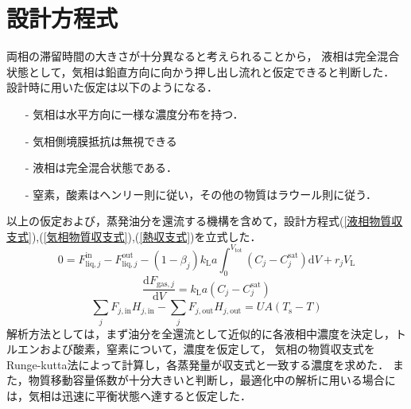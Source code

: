 \documentclass[a4j]{jsreport}
\newcommand{\diff}{\mathrm{d}}
\begin{document}
\section{設計方程式}
両相の滞留時間の大きさが十分異なると考えられることから，
液相は完全混合状態として，気相は鉛直方向に向かう押し出し流れと仮定できると判断した．
設計時に用いた仮定は以下のようになる．
\begin{itemize}
    \item[-] 気相は水平方向に一様な濃度分布を持つ．
    \item[-] 気相側境膜抵抗は無視できる
    \item[-] 液相は完全混合状態である．
    \item[-] 窒素，酸素はヘンリー則に従い，その他の物質はラウール則に従う．
\end{itemize}
以上の仮定および，蒸発油分を還流する機構を含めて，設計方程式(\ref{液相物質収支式}),(\ref{気相物質収支式}),(\ref{熱収支式})を立式した．\\
\begin{equation}
    \label{液相物質収支式}
    0 = F^\text{in}_{\text{liq},j} - F^\text{out}_{\text{liq},j} - (1-\beta_j) k_\mathrm{L}a
    \int^{V_\text{tot}}_0(C_j - C^\text{sat}_j) \diff V + r_j V_\mathrm{L}
\end{equation}
\begin{equation}
    \label{気相物質収支式}
    \frac{ \diff F_{\text{gas},j}}{\diff V} = k_\mathrm{L}a (C_j - C^\text{sat}_j)
\end{equation}
\begin{equation}
    \label{熱収支式}
    \sum_jF_{j,\mathrm{in}}H_{j,\mathrm{in}}-\sum_jF_{j,\text{out}}H_{j,\text{out}} = UA(T_\mathrm{s}-T)
\end{equation}
解析方法としては，まず油分を全還流として近似的に各液相中濃度を決定し，トルエンおよび酸素，窒素について，濃度を仮定して，
気相の物質収支式をRunge-kutta法によって計算し，各蒸発量が収支式と一致する濃度を求めた．
また，物質移動容量係数が十分大きいと判断し，最適化中の解析に用いる場合には，気相は迅速に平衡状態へ達すると仮定した．
\end{document}
